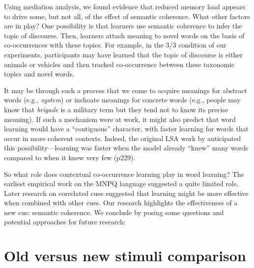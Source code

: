 \documentclass[man,floatsintext]{apa6}
\begin{document}
Using mediation analysis, we found evidence that reduced memory load appears to drive some, but not all, of the effect of semantic coherence. What other factors are in play? One possibility is that learners use semantic coherence to infer the topic of discourse. Then, learners attach meaning to novel words on the basis of co-occurrences with these topics. For example, in the 3/3 condition of our experiments, participants may have learned that the topic of discourse is either animals or vehicles and then tracked co-occurrence between these taxonomic topics and novel words.

It may be through such a process that we come to acquire meanings for abstract words (e.g., \emph{system}) or inchoate meanings for concrete words (e.g., people may know that \emph{brigade} is a military term but they tend not to know its precise meaning). If such a mechanism were at work, it might also predict that word learning would have a ``contiguous'' character, with faster learning for words that occur in more coherent contexts. Indeed, the original LSA work by\citet{landauer1997} anticipated this possibility---learning was faster when the model already ``knew'' many words compared to when it knew very few (p229).




So what role does contextual co-occurrence learning play in word learning? The earliest empirical work on the MNPQ language suggested a quite limited role. Later research on correlated cues suggested that learning might be more effective when combined with other cues. Our research highlights the effectiveness of a new cue: semantic coherence. We conclude by posing some questions and potential approaches for future research:

\newpage



\appendix
\section{Old versus new stimuli comparison}
\label{old-vs-new}
\end{document}
